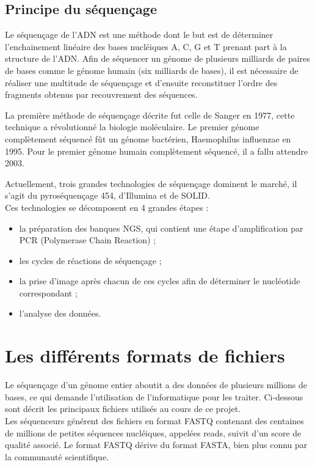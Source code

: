 \documentclass[a4paper,12pt]{article}
\begin{document}
\subsection{Principe du séquençage }

Le séquençage de l'ADN est une méthode dont le but est de déterminer l'enchainement linéaire des bases nucléiques A, C, G et T prenant part à la structure de l'ADN. Afin de séquencer un génome de plusieurs milliards de paires de bases comme le génome humain (six milliards de bases), il est nécessaire de réaliser une multitude de séquençage et d'ensuite reconstituer l'ordre des fragments obtenus par recouvrement des séquences.

La première méthode de séquençage décrite fut celle de Sanger en 1977, cette technique a révolutionné la biologie moléculaire. Le premier génome complètement séquencé fût un génome bactérien, Haemophilus influenzae en 1995. Pour le premier génome humain complètement séquencé, il a fallu attendre 2003. 

Actuellement, trois grandes technologies de séquençage dominent le marché, il s'agit du pyroséquençage 454, d'Illumina et de SOLID. \\

Ces technologies se décomposent en 4 grandes étapes :
\begin{itemize}
\item la préparation des banques NGS, qui contient une étape d'amplification par PCR (Polymerase Chain Reaction) ;
\item les cycles de réactions de séquençage ;
\item la prise d'image après chacun de ces cycles afin de déterminer le nucléotide correspondant ;
\item l'analyse des données. 
\end{itemize}



\section{Les différents formats de fichiers}

Le séquençage d'un génome entier aboutit a des données de plusieurs millions de bases, ce qui demande l'utilisation de l'informatique pour les traiter. Ci-dessous sont décrit les principaux fichiers utilisés au cours de ce projet. \\

Les séquenceurs générent des fichiers en format FASTQ contenant des centaines de millions de petites séquences nucléiques, appelées reads, suivit d'un score de qualité associé. Le format FASTQ dérive du format FASTA, bien plus connu par la communauté scientifique. 
\end{document}
